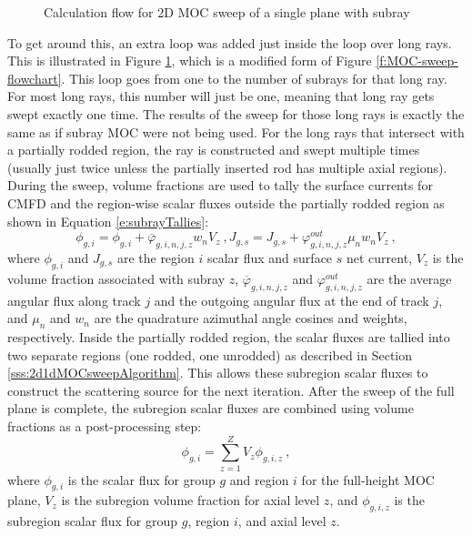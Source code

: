 \begin{figure}[h]
    \centering
    
    \caption{Calculation flow for 2D MOC sweep of a single plane with subray}\label{f:MOC-sweep-subray-flowchart}
\end{figure}

To get around this, an extra loop was added just inside the loop over long rays.  This is illustrated in Figure \ref{f:MOC-sweep-subray-flowchart}, which is a modified form of Figure \ref{f:MOC-sweep-flowchart}.  This loop goes from one to the number of subrays for that long ray.  For most long rays, this number will just be one, meaning that long ray gets swept exactly one time.  The results of the sweep for those long rays is exactly the same as if subray MOC were not being used.  For the long rays that intersect with a partially rodded region, the ray is constructed and swept multiple times (usually just twice unless the partially inserted rod has multiple axial regions).  During the sweep, volume fractions are used to tally the surface currents for CMFD and the region-wise scalar fluxes outside the partially rodded region as shown in Equation \ref{e:subrayTallies}:
\begin{subequations}\label{e:subrayTallies}
\begin{equation}
\phi_{g,i} = \phi_{g,i} + \overline{\varphi}_{g,i,n,j,z} w_n V_z\ ,
\end{equation}
\begin{equation}
J_{g,s} = J_{g,s} + \varphi_{g,i,n,j,z}^{out} \mu_n w_n V_z\ ,
\end{equation}
\end{subequations}
where $\phi_{g,i}$ and $J_{g,s}$ are the region $i$ scalar flux and surface $s$ net current, $V_z$ is the volume fraction associated with subray $z$, $\overline{\varphi}_{g,i,n,j,z}$ and $\varphi_{g,i,n,j,z}^{out}$ are the average angular flux along track $j$ and the outgoing angular flux at the end of track $j$, and $\mu_n$ and $w_n$ are the quadrature azimuthal angle cosines and weights, respectively.  Inside the partially rodded region, the scalar fluxes are tallied into two separate regions (one rodded, one unrodded) as described in Section \ref{sss:2d1dMOCsweepAlgorithm}.  This allows these subregion scalar fluxes to construct the scattering source for the next iteration.  After the sweep of the full plane is complete, the subregion scalar fluxes are combined using volume fractions as a post-processing step:
\begin{equation}\label{e:subrayPostProcess}
\phi_{g,i} = \sum_{z=1}^Z V_z \phi_{g,i,z}\ ,
\end{equation}
where $\phi_{g,i}$ is the scalar flux for group $g$ and region $i$ for the full-height MOC plane, $V_z$ is the subregion volume fraction for axial level $z$, and $\phi_{g,i,z}$ is the subregion scalar flux for group $g$, region $i$, and axial level $z$.

